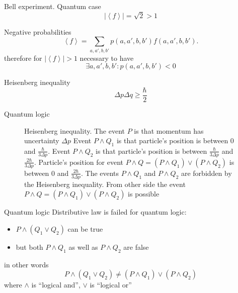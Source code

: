 \documentclass[10pt,pdf,hyperref={unicode}]{beamer}
\begin{document}
\begin{frame}{Bell experiment. Quantum case}
\[
\left|\left<f\right>\right| = \sqrt{2} > 1
\]
\end{frame}


\begin{frame}{Negative probabilities}
\[
\left<f\right> = \sum_{a,a',b,b'} p(a,a',b,b') f(a,a',b,b').
\]
therefore for $\left|\left<f\right>\right| > 1$ necessary to have
\[
\exists a,a',b,b': p(a,a',b,b') < 0
\]
\end{frame}

\begin{frame}{Heisenberg inequality}
  \[
  \Delta p \Delta q \ge \frac{\hbar}{2}
  \]
\end{frame}

\begin{frame}{Quantum logic}
\begin{figure}[H]
  \centering
  \caption{Heisenberg inequality. The event $P$ is that momentum has
    uncertainty $\Delta p$ Event $P \land Q_1$ is that particle's
    position is between $0$ and $\frac{\hbar}{3 \Delta p}$. Event
    $P \land Q_2$ is that particle's
    position is between $\frac{\hbar}{3 \Delta p}$ and
    $\frac{2\hbar}{3 \Delta p}$. Particle's position for event $P
    \land Q = (P \land Q_1)
    \lor (P \land Q_2)$ is between $0$ and $\frac{2\hbar}{3 \Delta p}$. The
    events $P \land Q_1$ and $P \land Q_2$ are forbidden by the Heisenberg
    inequality. From other side the event $P \land Q = (P \land Q_1)
    \lor (P \land Q_2)$ is possible}   
\end{figure}
\end{frame}

\begin{frame}{Quantum logic}
  Distributive law is failed for quantum logic:
  \begin{itemize}
  \item $P \land (Q_1 \lor Q_2)$ can be true
  \item but both $P \land Q_1$ as well as $P \land Q_2$ are false
  \end{itemize}
  in other words
  \[
  P \land (Q_1 \lor Q_2) \ne (P \land Q_1) \lor (P \land Q_2)
  \]
  where $\land$ is ``logical and'', $\lor$ is ``logical or''
\end{frame}
\end{document}
